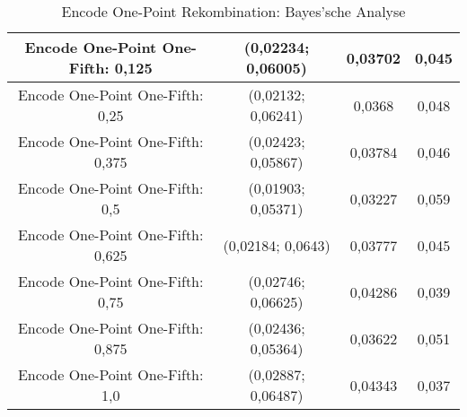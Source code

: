 \begin{table}[H]
\begin{tabular}{c | c | c | c}
		\hline
		\hline
		Encode One-Point One-Fifth: 0,125 & (0,02234; 0,06005) & 0,03702 & 0,045\\
		\hline
		Encode One-Point One-Fifth: 0,25 & (0,02132; 0,06241) & 0,0368 & 0,048\\
		\hline
		Encode One-Point One-Fifth: 0,375 & \color{Green}(0,02423; 0,05867)\color{black} & 0,03784 & 0,046\\
		\hline
		Encode One-Point One-Fifth: 0,5 & (0,01903; 0,05371) & \color{Green}0,03227\color{black} & \color{Green}0,059\color{black}\\
		\hline
		Encode One-Point One-Fifth: 0,625 & \color{red}(0,02184; 0,0643)\color{black} & 0,03777 & 0,045\\
		\hline
		Encode One-Point One-Fifth: 0,75 & (0,02746; 0,06625) & 0,04286 & 0,039\\
		\hline
		Encode One-Point One-Fifth: 0,875 & \color{Green}(0,02436; 0,05364)\color{black} & 0,03622 & 0,051\\
		\hline
		Encode One-Point One-Fifth: 1,0 & (0,02887; 0,06487) & 0,04343 & \color{red}0,037\color{black}\\
	\end{tabular}
	\caption{Encode One-Point Rekombination: Bayes'sche Analyse}
	\label{table:encodeOnePointBayesian}
\end{table} 
